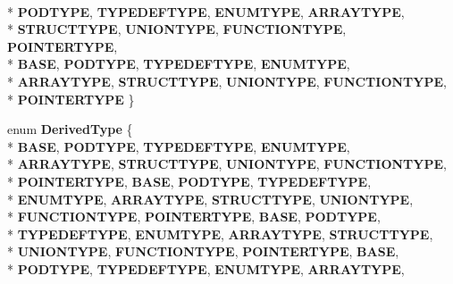 \begin{DoxyCompactItemize}
\\*
{\bfseries P\-O\-D\-T\-Y\-P\-E}, 
{\bfseries T\-Y\-P\-E\-D\-E\-F\-T\-Y\-P\-E}, 
{\bfseries E\-N\-U\-M\-T\-Y\-P\-E}, 
{\bfseries A\-R\-R\-A\-Y\-T\-Y\-P\-E}, 
\\*
{\bfseries S\-T\-R\-U\-C\-T\-T\-Y\-P\-E}, 
{\bfseries U\-N\-I\-O\-N\-T\-Y\-P\-E}, 
{\bfseries F\-U\-N\-C\-T\-I\-O\-N\-T\-Y\-P\-E}, 
{\bfseries P\-O\-I\-N\-T\-E\-R\-T\-Y\-P\-E}, 
\\*
{\bfseries B\-A\-S\-E}, 
{\bfseries P\-O\-D\-T\-Y\-P\-E}, 
{\bfseries T\-Y\-P\-E\-D\-E\-F\-T\-Y\-P\-E}, 
{\bfseries E\-N\-U\-M\-T\-Y\-P\-E}, 
\\*
{\bfseries A\-R\-R\-A\-Y\-T\-Y\-P\-E}, 
{\bfseries S\-T\-R\-U\-C\-T\-T\-Y\-P\-E}, 
{\bfseries U\-N\-I\-O\-N\-T\-Y\-P\-E}, 
{\bfseries F\-U\-N\-C\-T\-I\-O\-N\-T\-Y\-P\-E}, 
\\*
{\bfseries P\-O\-I\-N\-T\-E\-R\-T\-Y\-P\-E}
 \}
\item 
enum {\bfseries Derived\-Type} \{ \\*
{\bfseries B\-A\-S\-E}, 
{\bfseries P\-O\-D\-T\-Y\-P\-E}, 
{\bfseries T\-Y\-P\-E\-D\-E\-F\-T\-Y\-P\-E}, 
{\bfseries E\-N\-U\-M\-T\-Y\-P\-E}, 
\\*
{\bfseries A\-R\-R\-A\-Y\-T\-Y\-P\-E}, 
{\bfseries S\-T\-R\-U\-C\-T\-T\-Y\-P\-E}, 
{\bfseries U\-N\-I\-O\-N\-T\-Y\-P\-E}, 
{\bfseries F\-U\-N\-C\-T\-I\-O\-N\-T\-Y\-P\-E}, 
\\*
{\bfseries P\-O\-I\-N\-T\-E\-R\-T\-Y\-P\-E}, 
{\bfseries B\-A\-S\-E}, 
{\bfseries P\-O\-D\-T\-Y\-P\-E}, 
{\bfseries T\-Y\-P\-E\-D\-E\-F\-T\-Y\-P\-E}, 
\\*
{\bfseries E\-N\-U\-M\-T\-Y\-P\-E}, 
{\bfseries A\-R\-R\-A\-Y\-T\-Y\-P\-E}, 
{\bfseries S\-T\-R\-U\-C\-T\-T\-Y\-P\-E}, 
{\bfseries U\-N\-I\-O\-N\-T\-Y\-P\-E}, 
\\*
{\bfseries F\-U\-N\-C\-T\-I\-O\-N\-T\-Y\-P\-E}, 
{\bfseries P\-O\-I\-N\-T\-E\-R\-T\-Y\-P\-E}, 
{\bfseries B\-A\-S\-E}, 
{\bfseries P\-O\-D\-T\-Y\-P\-E}, 
\\*
{\bfseries T\-Y\-P\-E\-D\-E\-F\-T\-Y\-P\-E}, 
{\bfseries E\-N\-U\-M\-T\-Y\-P\-E}, 
{\bfseries A\-R\-R\-A\-Y\-T\-Y\-P\-E}, 
{\bfseries S\-T\-R\-U\-C\-T\-T\-Y\-P\-E}, 
\\*
{\bfseries U\-N\-I\-O\-N\-T\-Y\-P\-E}, 
{\bfseries F\-U\-N\-C\-T\-I\-O\-N\-T\-Y\-P\-E}, 
{\bfseries P\-O\-I\-N\-T\-E\-R\-T\-Y\-P\-E}, 
{\bfseries B\-A\-S\-E}, 
\\*
{\bfseries P\-O\-D\-T\-Y\-P\-E}, 
{\bfseries T\-Y\-P\-E\-D\-E\-F\-T\-Y\-P\-E}, 
{\bfseries E\-N\-U\-M\-T\-Y\-P\-E}, 
{\bfseries A\-R\-R\-A\-Y\-T\-Y\-P\-E}, 

\end{DoxyCompactItemize}
